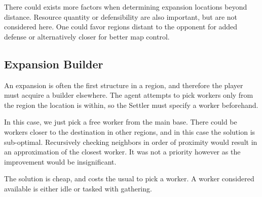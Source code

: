 	There could exists more factors when determining expansion locations beyond distance. Resource quantity or defensibility are also important, but are not considered here. One could favor regions distant to the opponent for added defense or alternatively closer for better map control.

	\subsection*{Expansion Builder}
	An expansion is often the first structure in a region, and therefore the player must acquire a builder elsewhere. The agent attempts to pick workers only from the region the location is within, so the Settler must specify a worker beforehand.
	
	In this case, we just pick a free worker from the main base. There could be workers closer to the destination in other regions, and in this case the solution is sub-optimal. Recursively checking neighbors in order of proximity would result in an approximation of the closest worker. It was not a priority however as the improvement would be insignificant.
	
	The solution is cheap, and costs the usual to pick a worker. A worker considered available is either idle or tasked with gathering.